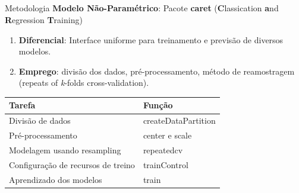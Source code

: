 \documentclass[12pt,ignorenonframetext,aspectratio=1610]{beamer}
\begin{document}
\subsection[Construção dos modelos preditivos]{}
\transwipe
\begin{frame}[t]{Metodologia}
\textbf{Modelo Não-Paramétrico}: Pacote \textbf{caret} (\textbf{C}lassication \textbf{a}nd \textbf{R}egression \textbf{T}raining) \cite{kuhn2013applied, R-caret}

\begin{enumerate}
\item \textbf{Diferencial}: Interface uniforme para treinamento e previsão de diversos modelos. \newline

\item \textbf{Emprego}: divisão dos dados, pré-processamento, método de reamostragem (repeats of \textit{k}-folds cross-validation).
\end{enumerate}
	
	\begin{table}[]
		\centering
		\begin{tabular}{@{}ll@{}}
			\toprule
			\textbf{Tarefa}                    & \textbf{Função}     \\ \midrule
			Divisão de dados                   & createDataPartition \\
			Pré-processamento                  & center e scale      \\
			Modelagem usando resampling        & repeatedcv          \\
			Configuração de recursos de treino & trainControl        \\
			Aprendizado dos modelos            & train               \\ \bottomrule
		\end{tabular}
	\end{table}

\end{frame}

\subsection[Estimativa de desempenho]{}
\end{document}

